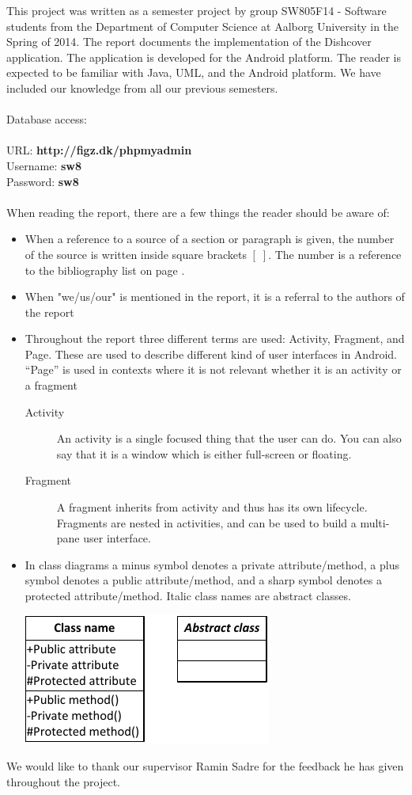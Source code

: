 This project was written as a semester project by group SW805F14 - Software students from the Department of Computer Science at Aalborg University in the Spring of 2014. The report documents the implementation of the Dishcover application. The application is developed for the Android platform. The reader is expected to be familiar with Java, UML, and the Android platform. We have included our knowledge from all our previous semesters.
\\\\
Database access:\\\\
URL: \textbf{http://figz.dk/phpmyadmin}\\
Username: \textbf{sw8}\\
Password: \textbf{sw8}\\\\
When reading the report, there are a few things the reader should be aware of:
\begin{itemize}
\item When a reference to a source of a section or paragraph is given, the number of the source is written inside square brackets $[\;]$. The number is a reference to the bibliography list on page \pageref{chap:bib}.
\item When "we/us/our" is mentioned in the report, it is a referral to the authors of the report
\item Throughout the report three different terms are used: Activity, Fragment, and Page. These are used to describe different kind of user interfaces in Android. ``Page'' is used in contexts where it is not relevant whether it is an activity or a fragment
\begin{description}
\item[Activity] An activity is a single focused thing that the user can do. You can also say that it is a window which is either full-screen or floating. \citep{activity}
\item[Fragment] A fragment inherits from activity and thus has its own lifecycle. Fragments are nested in activities, and can be used to build a multi-pane user interface. \citep{fragment}
\end{description}
\item In class diagrams a minus symbol denotes a private attribute/method, a plus symbol denotes a public attribute/method, and a sharp symbol denotes a protected attribute/method. Italic class names are abstract classes.
\begin{center}
\includegraphics[width=0.35\linewidth]{img/umltheory.pdf}
\end{center}
\end{itemize}

We would like to thank our supervisor Ramin Sadre for the feedback he has given throughout the project.